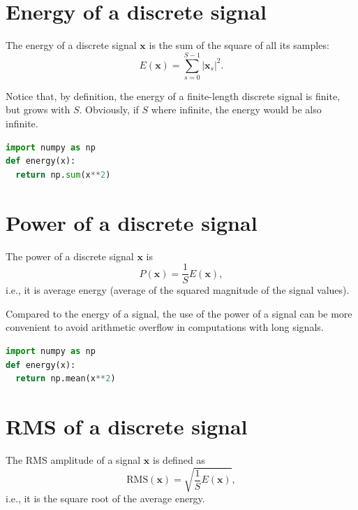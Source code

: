 \section{Energy of a discrete signal}
\label{sec:energy_signal}

The energy of a discrete signal $\bm{x}$ is the sum of the square
of all its samples:
\begin{equation}
  E(\bm{x}) = \sum_{s=0}^{S-1}|\bm{x}_s|^2.
\end{equation}

Notice that, by definition, the energy of a finite-length discrete
signal is finite, but grows with $S$. Obviously, if $S$ where infinite,
the energy would be also infinite.

\begin{lstlisting}[language=Python]
import numpy as np
def energy(x):
  return np.sum(x**2)
\end{lstlisting}


\section{Power of a discrete signal}
\label{sec:power_signal}

The power of a discrete signal $\bm{x}$ is
\begin{equation}
  P(\bm{x}) = \frac{1}{S}E(\bm{x}),
  \label{eq:power_discrete_signal}
\end{equation}
i.e., it is average energy (average of the squared magnitude of the
signal values).

Compared to the energy of a signal, the use of the power of a signal
can be more convenient to avoid arithmetic overflow in computations
with long signals.

\begin{lstlisting}[language=Python]
import numpy as np
def energy(x):
  return np.mean(x**2)
\end{lstlisting}



\section{\gls{RMS} of a discrete signal}
\label{sec:RMS_amplitude}
The \gls{RMS} amplitude of a signal $\bm{x}$ is defined as
\begin{equation}
  \text{RMS}(\bm{x}) = \sqrt{\frac{1}{S}E(\bm{x})},
  \label{eq:power_discrete_signal}
\end{equation}
i.e., it is the square root of the average energy.

